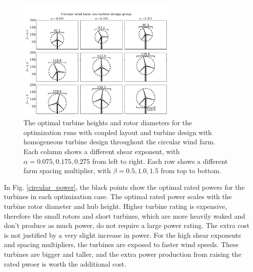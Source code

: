 \begin{figure}[htbp]
  \centering
  \includegraphics[trim={0.5cm 0.3cm 0.3cm 2.75cm},clip,width=0.7\textwidth]{Figures/turbineSizesCircular_1.pdf}
  \caption{\label{circular_turbines_1} The optimal turbine heights and rotor diameters for the optimization runs with coupled layout and turbine design with homogeneous turbine design throughout the circular wind farm. Each column shows a different shear exponent, with $\alpha=0.075,0.175,0.275$ from left to right. Each row shows a different farm spacing multiplier, with $\beta=0.5,1.0,1.5$ from top to bottom.}
\end{figure}


In Fig. \ref{circular_power}, the black points show the optimal rated powers for the turbines in each optimization case. The optimal rated power scales with the turbine rotor diameter and hub height. Higher turbine rating is expensive, therefore the small rotors and short turbines, which are more heavily waked and don't produce as much power, do not require a large power rating. The extra cost is not justified by a very slight increase in power. For the high shear exponents and spacing multipliers, the turbines are exposed to faster wind speeds. These turbines are bigger and taller, and the extra power production from raising the rated pwoer is worth the additional cost.



